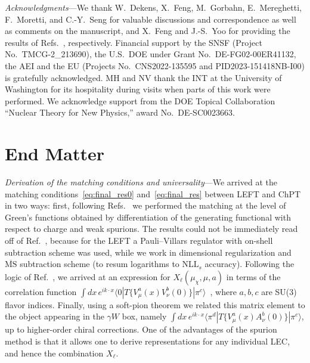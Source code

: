 \documentclass[prl,twocolumn,twoside,preprintnumbers,superscriptaddress,nofootinbib,letterpaper]{revtex4-1}
\begin{document}
\emph{Acknowledgments}---We thank W.~Dekens, X.~Feng, M.~Gorbahn, E.~Mereghetti, F.~Moretti, and C.-Y.~Seng for valuable discussions and correspondence as well as comments on the manuscript, and X.~Feng and J.-S.~Yoo for providing the results of Refs.~\cite{Feng:2020zdc,Yoo:2023gln}, respectively.
Financial support by  the SNSF (Project No.\ TMCG-2\_213690),  the U.S.\ DOE under Grant No.\ DE-FG02-00ER41132, the AEI and the EU (Projects No.\ CNS2022-135595 and PID2023-151418NB-I00) is gratefully acknowledged. MH and NV thank the INT at the University of Washington for its hospitality during visits when parts of this work were performed.
We acknowledge support from the DOE Topical Collaboration ``Nuclear Theory for New Physics,'' award No.\ DE-SC0023663.

\section{End Matter}

\emph{Derivation of the matching conditions and universality}---We arrived at  the matching conditions~\eqref{eq:final_res0} and~\eqref{eq:final_res}
between LEFT and ChPT in two ways:
first, following Refs.~\cite{Descotes-Genon:2005wrq,Cirigliano:2023fnz} we  performed the matching at the level of
Green's functions obtained by  differentiation of the generating functional with respect to charge and weak spurions.
The results could not be immediately read off of Ref.~\cite{Descotes-Genon:2005wrq}, because for the LEFT
a Pauli--Villars regulator with on-shell subtraction scheme was used, while
 we work in dimensional regularization and $\overline{\text{MS}}$ subtraction scheme (to resum logarithms to $\text{NLL}_s$ accuracy).
Following the logic of  Ref.~\cite{Descotes-Genon:2005wrq},   we arrived at an expression for  $X_\ell(\mu_\chi,\mu,a)$
in terms of the correlation function   $\int dx\, e^{i k\cdot x}  \langle 0 | T \big\{V_\mu^a (x) V_\nu^b (0)\big\} | \pi^c \rangle$~\cite{Supp},
where $a,b,c$ are
SU(3) flavor indices.
Finally, using a  soft-pion theorem we  related  this matrix element to the object appearing in  the $\gamma W$ box,
namely $\int dx\, e^{i k\cdot x}  \langle  \pi^d | T \big\{V_\mu^a (x) A_\nu^b (0)\big\} | \pi^c \rangle$, up to higher-order chiral corrections.
One of the advantages of the  spurion method  is that it allows one to derive representations for any individual LEC,
and hence the combination  $X_\ell$.
\end{document}
